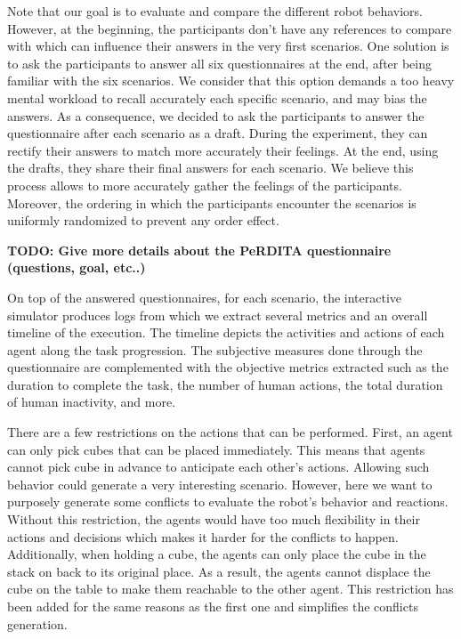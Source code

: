 Note that our goal is to evaluate and compare the different robot behaviors. However, at the beginning, the participants don't have any references to compare with which can influence their answers in the very first scenarios. One solution is to ask the participants to answer all six questionnaires at the end, after being familiar with the six scenarios. We consider that this option demands a too heavy mental workload to recall accurately each specific scenario, and may bias the answers. As a consequence, we decided to ask the participants to answer the questionnaire after each scenario as a draft. During the experiment, they can rectify their answers to match more accurately their feelings. At the end, using the drafts, they share their final answers for each scenario. We believe this process allows to more accurately gather the feelings of the participants. Moreover, the ordering in which the participants encounter the scenarios is uniformly randomized to prevent any order effect. 

\textbf{TODO: Give more details about the PeRDITA questionnaire (questions, goal, etc..)}

On top of the answered questionnaires, for each scenario, the interactive simulator produces logs from which we extract several metrics and an overall timeline of the execution. The timeline depicts the activities and actions of each agent along the task progression. The subjective measures done through the questionnaire are complemented with the objective metrics extracted such as the duration to complete the task, the number of human actions, the total duration of human inactivity, and more. 


There are a few restrictions on the actions that can be performed. First, an agent can only pick cubes that can be placed immediately. This means that agents cannot pick cube in advance to anticipate each other's actions. Allowing such behavior could generate a very interesting scenario. However, here we want to purposely generate some conflicts to evaluate the robot's behavior and reactions. Without this restriction, the agents would have too much flexibility in their actions and decisions which makes it harder for the conflicts to happen.  
Additionally, when holding a cube, the agents can only place the cube in the stack on back to its original place. As a result, the agents cannot displace the cube on the table to make them reachable to the other agent. This restriction has been added for the same reasons as the first one and simplifies the conflicts generation. 


